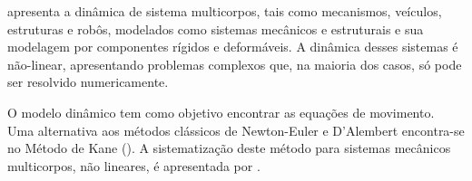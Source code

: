 \citet{huston1991multibody} apresenta a dinâmica
de sistema multicorpos, tais como mecanismos, veículos, estruturas e robôs, 
modelados como sistemas mecânicos e estruturais e
\citet{shabana2013dynamics} sua modelagem por componentes rígidos e
deformáveis. A dinâmica desses sistemas é não-linear, apresentando problemas complexos que, na maioria dos casos, só pode ser resolvido numericamente.

O modelo dinâmico tem como objetivo encontrar as equações de movimento.
Uma alternativa aos métodos clássicos de Newton-Euler e D'Alembert encontra-se
no Método de Kane (\citet{kane1985dynamics}). A sistematização deste método para sistemas mecânicos multicorpos, não lineares, é apresentada por
\citet{lesser1995analysis}.




